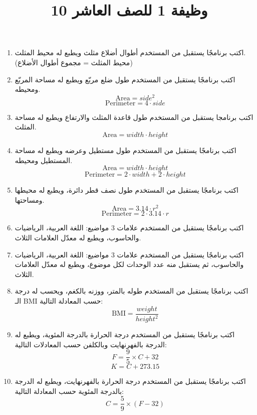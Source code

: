 \documentclass[12pt]{article}
\title{وظيفة 1 للصف العاشر 10}
\begin{document}
\maketitle
\thispagestyle{fancy}

\begin{enumerate}

\item
اكتب برنامجًا يستقبل من المستخدم أطوال أضلاع مثلث ويطبع له محيط المثلث. \\
(محيط المثلث = مجموع أطوال الأضلاع) \\

\item
اكتب برنامجًا يستقبل من المستخدم طول ضلع مربّع ويطبع له مساحة المربّع ومحيطه.
$$ \text{Area} = side ^ 2 $$
$$ \text{Perimeter} = 4 \cdot side $$

\item
اكتب برنامجا يستقبل من المستخدم طول قاعدة المثلث والارتفاع ويطبع له مساحة المثلث.
$$ \text{Area} = width \cdot height $$

\item
اكتب برنامجًا يستقبل من المستخدم طول مستطيل وعرضه ويطبع له مساحة المستطيل ومحيطه.
$$ \text{Area} = width \cdot height $$
$$ \text{Perimeter} = 2 \cdot width + 2 \cdot height $$

\item
اكتب برنامجًا يستقبل من المستخدم طول نصف قطر دائرة، ويطبع له محيطها ومساحتها.
$$ \text{Area} = 3.14 \cdot r^2 $$
$$ \text{Perimeter} = 2 \cdot 3.14 \cdot r $$

\item
اكتب برنامجًا يستقبل من المستخدم علامات 3 مواضيع: اللغة العربية، الرياضيات والحاسوب، ويطبع له معدّل العلامات الثلاث.

\item
اكتب برنامجًا يستقبل من المستخدم علامات 3 مواضيع: اللغة العربية، الرياضيات والحاسوب، ثم يستقبل منه عدد الوحدات لكل موضوع، ويطبع له معدّل العلامات الثلاث.

\item
اكتب برنامجًا يستقبل من المستخدم طوله بالمتر، ووزنه بالكغم، ويحسب له درجة الـ BMI حسب المعادلة التالية:
$$ \text{BMI} = \frac{weight}{height^2} $$

\item
اكتب برنامجًا يستقبل من المستخدم درجة الحرارة بالدرجة المئوية، ويطبع له الدرجة بالفهرنهايت وبالكلفن حسب المعادلات التالية:
$$ F = \frac{9}{5} \times C + 32 $$
$$ K = C + 273.15 $$

\item
اكتب برنامجًا يستقبل من المستخدم درجة الحرارة بالفهرنهايت، ويطبع له الدرجة بالدرجة المئوية حسب المعادلة التالية:
$$ C = \frac{5}{9} \times (F - 32) $$


\end{enumerate}
\end{document}
